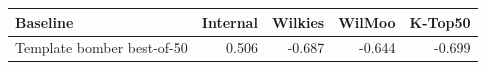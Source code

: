 \begin{tabular}{lrrrr}
\toprule
Baseline & Internal & Wilkies & WilMoo & K-Top50 \\
\midrule
Template bomber best-of-50 & 0.506 & -0.687 & -0.644 & -0.699 \\
\bottomrule
\end{tabular}
